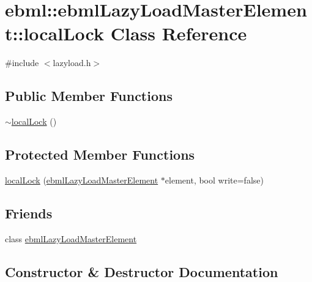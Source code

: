 \hypertarget{classebml_1_1ebmlLazyLoadMasterElement_1_1localLock}{}\section{ebml\+:\+:ebml\+Lazy\+Load\+Master\+Element\+:\+:local\+Lock Class Reference}
\label{classebml_1_1ebmlLazyLoadMasterElement_1_1localLock}


{\ttfamily \#include $<$lazyload.\+h$>$}

\subsection*{Public Member Functions}
\begin{DoxyCompactItemize}
\item 
\mbox{\hyperlink{classebml_1_1ebmlLazyLoadMasterElement_1_1localLock_afc16a3f337c35cbb91cb4c43e983fc68}{$\sim$local\+Lock}} ()
\end{DoxyCompactItemize}
\subsection*{Protected Member Functions}
\begin{DoxyCompactItemize}
\item 
\mbox{\hyperlink{classebml_1_1ebmlLazyLoadMasterElement_1_1localLock_a4526eedac62c950d946fcba2a7cbd5f2}{local\+Lock}} (\mbox{\hyperlink{classebml_1_1ebmlLazyLoadMasterElement}{ebml\+Lazy\+Load\+Master\+Element}} $\ast$element, bool write=false)
\end{DoxyCompactItemize}
\subsection*{Friends}
\begin{DoxyCompactItemize}
\item 
class \mbox{\hyperlink{classebml_1_1ebmlLazyLoadMasterElement_1_1localLock_a92527824eaab5d02febc4af62ac61ecb}{ebml\+Lazy\+Load\+Master\+Element}}
\end{DoxyCompactItemize}


\subsection{Constructor \& Destructor Documentation}
\mbox{\label{classebml_1_1ebmlLazyLoadMasterElement_1_1localLock_a4526eedac62c950d946fcba2a7cbd5f2}} 
